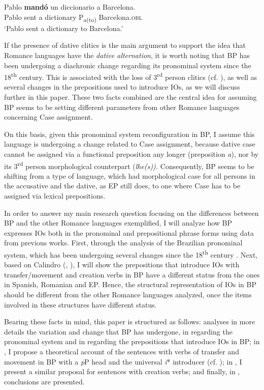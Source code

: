 \documentclass[output=paper,colorlinks,citecolor=brown,nonflat]{./langscibook}
\begin{document}
\ea%
    \label{ex:calindro:9}
    \gll Pablo \textbf{mandó} un diccionario  {a} {Barcelona}.\\
    Pablo  sent      a dictionary     P\textsubscript{{a(to)}} Barcelona.\textsc{obl}\\
    \glt `Pablo sent a dictionary to Barcelona.'\hfill \citep[48]{Cuervo2003}
    \z

If the presence of dative clitics is the main argument to support the idea that Romance languages have the \textit{dative alternation}, it is worth noting that BP has been undergoing a diachronic change regarding its pronominal system since the 18\textsuperscript{th} century. This is associated with the loss of 3\textsuperscript{rd} person clitics (cf. \citealt{CarvalhoCalindro2018}), as well as several changes in the prepositions used to introduce IOs, as we will discuss further in this paper. These two facts combined are the central idea for assuming BP seems to be setting different parameters from other Romance languages concerning Case assignment.

On this basis, given this pronominal system reconfiguration in BP, I assume this language is undergoing a change related to Case assignment, because dative case cannot be assigned via a functional preposition any longer (preposition \textit{a}), nor by its 3\textsuperscript{rd} person morphological counterpart (\textit{lhe(s)).} Consequently, BP seems to be shifting from a type of language, which had morphological case for all persons in the accusative and the dative, as EP still does, to one where Case has to be assigned via lexical prepositions.

In order to answer my main research question focusing on the differences between BP and the other Romance languages exemplified, I will analyze how BP expresses IOs both in the pronominal and prepositional phrase forms using data from previous works. First, through the analysis of the Brazilian pronominal system, which has been undergoing several changes since the 18\textsuperscript{th} century \citep{KatoCyrinoCorrêa2009}. Next, based on Calindro (\citeyear{Calindro2015}, \citeyear{Calindro2016}), I will show the prepositions that introduce IOs with transfer/movement and creation verbs in BP have a different status from the ones in Spanish, Romanian and EP. Hence, the structural representation of IOs in BP should be different from the other Romance languages analyzed, once the items involved in these structures have different status.

Bearing these facts in mind, this paper is structured as follows:  analyses in more details the variation and change that BP has undergone, in  regarding the pronominal system and in  regarding the prepositions that introduce IOs in BP; in , I propose a theoretical account of the sentences with verbs of transfer and movement in BP with a \textit{p}P head and the universal \textit{i}* introducer (cf. \citealt{Wood2012, WoodMarantz2017}); in , I present a similar proposal for sentences with creation verbs; and finally, in , conclusions are presented.
\end{document}
